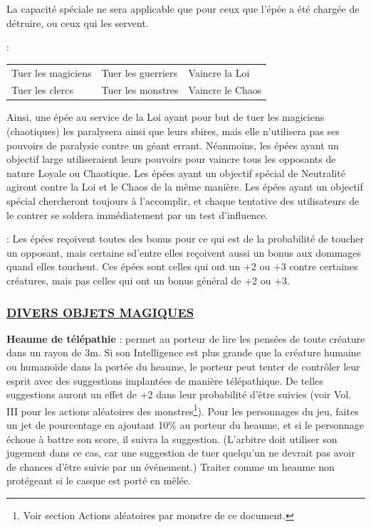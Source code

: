 \documentclass[11pt]{article}
\newcommand{\myunderline}[1]{\underline{\smash{#1}}}
\begin{document}
{{\bigskip

La capacité spéciale ne sera applicable que pour ceux que l'épée a été chargée de détruire, ou ceux qui les servent.

\myunderline{\textbf{Objectifs}}:

\medskip

{\parindent1.5cm\begin{tabular}{p{4.6cm}p{4.6cm}p{4.6cm}}
Tuer les magiciens & Tuer les guerriers & Vaincre la Loi \\
Tuer les clercs & Tuer les monstres & Vaincre le Chaos \\
\end{tabular}}

\bigskip

Ainsi, une épée au service de la Loi ayant pour but de tuer les magiciens (chaotiques) les paralysera ainsi que leurs sbires, mais elle n'utilisera pas ses pouvoirs de paralysie contre un géant errant. Néanmoins, les épées ayant un objectif large utiliseraient leurs pouvoirs pour vaincre tous les opposants de nature Loyale ou Chaotique. Les épées ayant un objectif spécial de Neutralité agiront contre la Loi et le Chaos de la même manière. Les épées ayant un objectif spécial chercheront toujours à l'accomplir, et chaque tentative des utilisateurs de le contrer se soldera immédiatement par un test d'influence.

\bigskip

\myunderline{\textbf{EPEES, BONUS AUX DOMMAGES}} : Les épées reçoivent toutes des bonus pour ce qui est de la probabilité de toucher un opposant, mais certaine sd'entre elles reçoivent aussi un bonus aux dommages quand elles touchent. Ces épées sont celles qui ont un +2 ou +3 contre certaines créatures, mais pas celles qui ont un bonus général de +2 ou +3.

\subsubsection*{\underline{DIVERS OBJETS MAGIQUES}}

\textbf{Heaume de télépathie} : permet au porteur de lire les pensées de toute créature dans un rayon de 3m. Si son Intelligence est plus grande que la créature humaine ou humanoïde dans la portée du heaume, le porteur peut tenter de contrôler leur esprit avec des suggestions implantées de manière télépathique. De telles suggestions auront un effet de +2 dans leur probabilité d'être suivies (voir Vol. III pour les actions aléatoires des monstres\footnote{Voir section \og Actions aléatoires par monstre \fg{} de ce document.}). Pour les personnages du jeu, faites un jet de pourcentage en ajoutant 10\% au porteur du heaume, et si le personnage échoue à battre son score,%
il suivra la suggestion. (L'arbitre doit utiliser son jugement dans ce cas, car une suggestion de tuer quelqu'un ne devrait pas avoir de chances d'être suivie par un événement.) Traiter comme un heaume non protégeant si le casque est porté en mêlée.

}}
\end{document}
